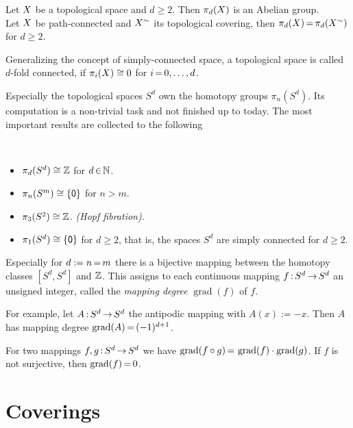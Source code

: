 \documentclass[11pt,twoside]{article}
\begin{document}
\begin{theorem1}
Let $X$ be a topological space and $d \geq 2$.
Then $\pi_d(X)$ is an Abelian group.\\
Let $X$ be path-connected and $X^{\sim}$ its topological covering,
then $\pi_d(X) {\,=\,} \pi_d(X^{\sim})$ for $d \geq 2$.
\end{theorem1}

\subparagraph{}
Generalizing the concept of simply-connected space,
a topological space is called $d$-fold connected,
if $\pi_i(X) \cong 0$ for $i {\,=\,} 0,\ldots,d$.

\subparagraph{}
Especially the topological spaces $S^d$ own the homotopy groups
$\pi_n(S^d)$.
Its computation is a non-trivial task and not finished up to today.
The most important results are collected to the following

\begin{theorem1}\,
\begin{itemize}[leftmargin=22pt]
\item[1.]
$\pi_d(S^d) \cong {\mathbb{Z}}$ for $d {\,\in\,} {\mathbb{N}}$.
\item[2.]
$\pi_n(S^m) \cong \{{\mathsf{0}}\}$ for $n > m$.
\item[3.]
$\pi_3(S^2) \cong {\mathbb{Z}}$. \textit{(Hopf fibration).}
\item[4.]
$\pi_1(S^d) \cong \{{\mathsf{0}}\}$ for $d \geq 2$,
that is,
the spaces $S^d$ are simply connected for $d \geq 2$.
\end{itemize}
\end{theorem1}

\subparagraph{}
Especially for $d := n {\,=\,} m$ there is a bijective mapping
between the homotopy classes $[S^d,S^d]$ and ${\mathbb{Z}}$.
This assigns to each continuous mapping $f {\,:\,} S^d {\,\to\,} S^d$ an unsigned integer,
called the \textit{mapping degree} $\operatorname{grad}(f)$ of $f$.

\subparagraph{}
For example,
let $A {\,:\,} S^d {\,\to\,} S^d$ the antipodic mapping with $A(x) := -x$.
Then $A$ has mapping degree $\operatorname{grad}(A) {\,=\,} (-1)^{d+1}$.

\subparagraph{}
For two mappings $f,g{\,:\,}S^d {\,\to\,} S^d$ we have
$\operatorname{grad} (f \circ g) {\,=\,}
 \operatorname{grad} (f) \cdot
 \operatorname{grad} (g)$.
If $f$ is not surjective, then $\operatorname{grad} (f) {\,=\,} 0$.

\part{Coverings}                                                               %
\end{document}
